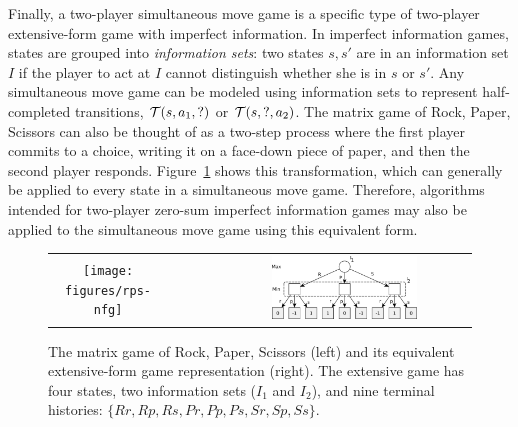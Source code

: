 Finally, a two-player simultaneous move game is a specific type of two-player extensive-form game with imperfect information.
In imperfect information
games, states are grouped into {\it information sets}: two states $s, s'$ are in an information set $I$ if the player
to act at $I$ cannot distinguish whether she is in $s$ or $s'$. Any simultaneous move game can be modeled
using information sets to represent half-completed transitions, \ie $\mathcal{T}(s, a_1, ?)$ or $\mathcal{T}(s, ?, a_2)$.
The matrix game of Rock, Paper, Scissors can also be thought of as a two-step process where the first player commits
to a choice, writing it on a face-down piece of paper, and then the second player responds. Figure~\ref{fig:rps-equiv} shows this
transformation, which can generally be applied to every state in a simultaneous move game.
Therefore, algorithms intended for two-player zero-sum imperfect information games may also be applied to the
simultaneous move game using this equivalent form.

\begin{figure}
\begin{center}
\begin{tabular}{ccc}
\texttt{[image: figures/rps-nfg]} & ~~~~~ & \includegraphics[width=0.6\textwidth]{figures/rps-new} \\
\end{tabular}
\end{center}
\caption{The matrix game of Rock, Paper, Scissors (left) and its equivalent extensive-form game representation (right). The extensive
game has four states, two information sets ($I_1$ and $I_2$),
and nine terminal histories: $\{ Rr, Rp, Rs, Pr, Pp, Ps, Sr, Sp, Ss \}$. \label{fig:rps-equiv}}
\end{figure}


